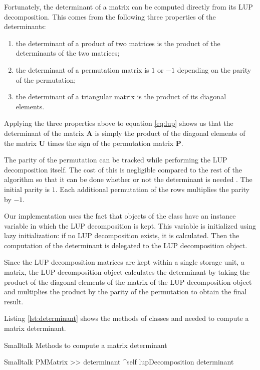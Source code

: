 Fortunately, the determinant of a matrix can be computed directly
from its LUP decomposition. This comes from the following three
properties of the determinants:
\begin{enumerate}
  \item the determinant of a product of two matrices is the product of the determinants of the two
  matrices;
  \item the determinant of a permutation matrix is $1$ or $-1$ depending on the parity of the
  permutation;
  \item the determinant of a triangular matrix is the product of its diagonal elements.
\end{enumerate}
Applying the three properties above to equation \ref{eq:lup} shows
us that the determinant of the matrix $\textbf{A}$ is simply the
product of the diagonal elements of the matrix $\textbf{U}$ times the
sign of the permutation matrix $\textbf{P}$.

The parity of the permutation can be tracked while performing the
LUP decomposition itself. The cost of this is negligible compared
to the rest of the algorithm so that it can be done whether or not
the determinant is needed . The initial parity is $1$. Each
additional permutation of the rows multiplies the parity by $-1$.

Our implementation uses the fact that objects of the class  have an instance variable in which the LUP decomposition
is kept. This variable is initialized using lazy initialization:
if no LUP decomposition exists, it is calculated. Then the
computation of the determinant is delegated to the LUP
decomposition object.

Since the LUP decomposition matrices are kept within a single
storage unit, a matrix, the LUP decomposition object calculates
the determinant by taking the product of the diagonal elements of
the matrix of the LUP decomposition object and multiplies the
product by the parity of the permutation to obtain the final
result.

Listing \ref{lst:determinant} shows the methods of classes  and  needed to compute a matrix determinant.

\begin{listing}[label=lst:determinant]{Smalltalk}
{Methods to compute a matrix determinant}
\end{listing}
\begin{displaycode}{Smalltalk}
PMMatrix >> determinant
  ^self lupDecomposition determinant
\end{displaycode}

